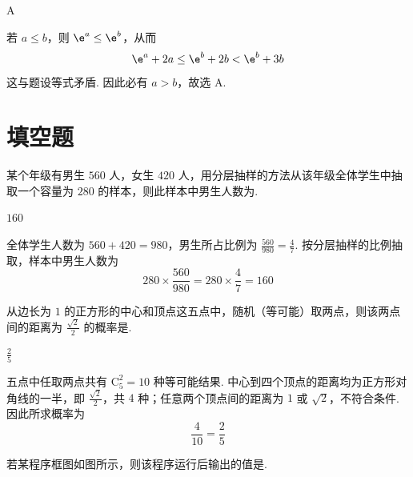 \begin{answer}
A
\end{answer}

\begin{solution}
若 \(a\leq b\)，则 \(\e^a\leq\e^b\)，从而
\[
\e^a+2a\leq\e^b+2b<\e^b+3b
\]
这与题设等式矛盾. 因此必有 \(a>b\)，故选 A.
\end{solution}

\section{填空题}

\begin{problem}
某个年级有男生 \(560\text{ 人}\)，女生 \(420\text{ 人}\)，用分层抽样的方法从该年级全体学生中抽取一个容量为 \(280\) 的样本，则此样本中男生人数为\fillinblank{}.
\end{problem}

\begin{answer}
\(160\)
\end{answer}

\begin{solution}
全体学生人数为 \(560+420=980\)，男生所占比例为 \(\frac{560}{980}=\frac47\). 按分层抽样的比例抽取，样本中男生人数为
\[
280\times\frac{560}{980}=280\times\frac47=160
\]
\end{solution}

\begin{problem}
从边长为 \(1\) 的正方形的中心和顶点这五点中，随机（等可能）取两点，则该两点间的距离为 \(\frac{\sqrt{2}}{2}\) 的概率是\fillinblank{}.
\end{problem}

\begin{answer}
\(\frac{2}{5}\)
\end{answer}

\begin{solution}
五点中任取两点共有 \(\mathrm C_5^2=10\) 种等可能结果. 中心到四个顶点的距离均为正方形对角线的一半，即 \(\frac{\sqrt2}{2}\)，共 \(4\) 种；任意两个顶点间的距离为 \(1\) 或 \(\sqrt2\)，不符合条件. 因此所求概率为
\[
\frac4{10}=\frac25
\]
\end{solution}

\begin{problem}
若某程序框图如图所示，则该程序运行后输出的值是\fillinblank{}.

\end{problem}

